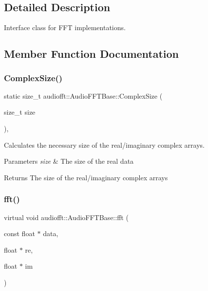 \subsection{Detailed Description}
Interface class for F\+FT implementations. 

\subsection{Member Function Documentation}
\mbox{\label{classaudiofft_1_1_audio_f_f_t_base_af0919d60c2bd7a05127625bfcc5c6a08}} 
\subsubsection{\texorpdfstring{Complex\+Size()}{ComplexSize()}}
{\footnotesize\ttfamily static size\+\_\+t audiofft\+::\+Audio\+F\+F\+T\+Base\+::\+Complex\+Size (\begin{DoxyParamCaption}\item[{size\+\_\+t}]{size }\end{DoxyParamCaption})\hspace{0.3cm}{\ttfamily [inline]}, {\ttfamily [static]}}



Calculates the necessary size of the real/imaginary complex arrays. 


\begin{DoxyParams}{Parameters}
{\em size} & The size of the real data \\
\hline
\end{DoxyParams}
\begin{DoxyReturn}{Returns}
The size of the real/imaginary complex arrays 
\end{DoxyReturn}
\mbox{\label{classaudiofft_1_1_audio_f_f_t_base_a6bc26fdcecf8fc098b56bdf6d0701ac5}} 
\subsubsection{\texorpdfstring{fft()}{fft()}}
{\footnotesize\ttfamily virtual void audiofft\+::\+Audio\+F\+F\+T\+Base\+::fft (\begin{DoxyParamCaption}\item[{const float $\ast$}]{data,  }\item[{float $\ast$}]{re,  }\item[{float $\ast$}]{im }\end{DoxyParamCaption})\hspace{0.3cm}{\ttfamily [pure virtual]}}



